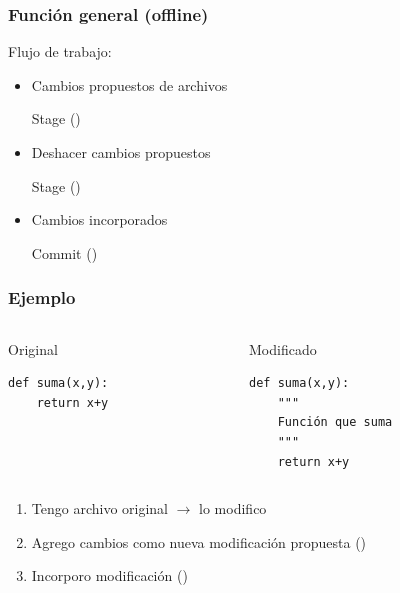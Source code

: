 \documentclass[14pt,aspectratio=169,xcolor=dvipsnames]{beamer}
\begin{document}
\begin{frame}\frametitle{Función general (offline)}
    Flujo de trabajo:
    \begin{itemize}
        \item Cambios propuestos de archivos \phantom{ }
            
            \begin{minipage}{0.35\textwidth}
            \begin{block}{}
                Stage \hfill()
            \end{block}
            \end{minipage}
        \item Deshacer cambios propuestos \phantom{ }
            
            \begin{minipage}{0.35\textwidth}
            \begin{block}{}
                Stage \hfill()
            \end{block}
            \end{minipage}

        \item Cambios incorporados \phantom{ }

            \begin{minipage}{0.35\textwidth}
            \begin{block}{}
                Commit \hfill()
            \end{block}
            \end{minipage}
    \end{itemize}
\end{frame}
\begin{frame}[t,fragile]\frametitle{Ejemplo}
  \begin{columns}
    \begin{column}[t]{0.45\textwidth}
        Original
        \begin{verbatim}
def suma(x,y):
    return x+y
        \end{verbatim}
    \end{column}
    \begin{column}[t]{0.45\textwidth}
        Modificado
        \begin{verbatim}
def suma(x,y):
    """
    Función que suma
    """
    return x+y
        \end{verbatim}
    \end{column}
  \end{columns}
    
\begin{enumerate}
    \item Tengo archivo original $\to$ lo modifico
    \item Agrego cambios como nueva modificación propuesta \hfill ()
    \item Incorporo modificación \hfill ()
\end{enumerate}
\end{frame}
\end{document}

